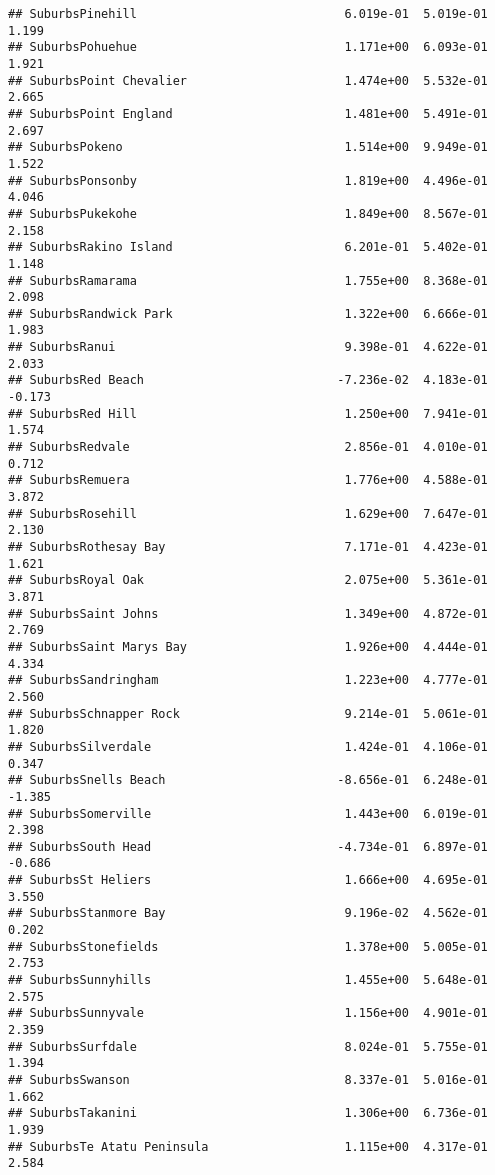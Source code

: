 \documentclass[
]{article}
\begin{document}
\begin{verbatim}
## SuburbsPinehill                             6.019e-01  5.019e-01   1.199
## SuburbsPohuehue                             1.171e+00  6.093e-01   1.921
## SuburbsPoint Chevalier                      1.474e+00  5.532e-01   2.665
## SuburbsPoint England                        1.481e+00  5.491e-01   2.697
## SuburbsPokeno                               1.514e+00  9.949e-01   1.522
## SuburbsPonsonby                             1.819e+00  4.496e-01   4.046
## SuburbsPukekohe                             1.849e+00  8.567e-01   2.158
## SuburbsRakino Island                        6.201e-01  5.402e-01   1.148
## SuburbsRamarama                             1.755e+00  8.368e-01   2.098
## SuburbsRandwick Park                        1.322e+00  6.666e-01   1.983
## SuburbsRanui                                9.398e-01  4.622e-01   2.033
## SuburbsRed Beach                           -7.236e-02  4.183e-01  -0.173
## SuburbsRed Hill                             1.250e+00  7.941e-01   1.574
## SuburbsRedvale                              2.856e-01  4.010e-01   0.712
## SuburbsRemuera                              1.776e+00  4.588e-01   3.872
## SuburbsRosehill                             1.629e+00  7.647e-01   2.130
## SuburbsRothesay Bay                         7.171e-01  4.423e-01   1.621
## SuburbsRoyal Oak                            2.075e+00  5.361e-01   3.871
## SuburbsSaint Johns                          1.349e+00  4.872e-01   2.769
## SuburbsSaint Marys Bay                      1.926e+00  4.444e-01   4.334
## SuburbsSandringham                          1.223e+00  4.777e-01   2.560
## SuburbsSchnapper Rock                       9.214e-01  5.061e-01   1.820
## SuburbsSilverdale                           1.424e-01  4.106e-01   0.347
## SuburbsSnells Beach                        -8.656e-01  6.248e-01  -1.385
## SuburbsSomerville                           1.443e+00  6.019e-01   2.398
## SuburbsSouth Head                          -4.734e-01  6.897e-01  -0.686
## SuburbsSt Heliers                           1.666e+00  4.695e-01   3.550
## SuburbsStanmore Bay                         9.196e-02  4.562e-01   0.202
## SuburbsStonefields                          1.378e+00  5.005e-01   2.753
## SuburbsSunnyhills                           1.455e+00  5.648e-01   2.575
## SuburbsSunnyvale                            1.156e+00  4.901e-01   2.359
## SuburbsSurfdale                             8.024e-01  5.755e-01   1.394
## SuburbsSwanson                              8.337e-01  5.016e-01   1.662
## SuburbsTakanini                             1.306e+00  6.736e-01   1.939
## SuburbsTe Atatu Peninsula                   1.115e+00  4.317e-01   2.584

\end{verbatim}
\end{document}

